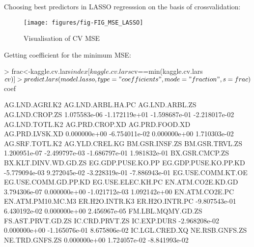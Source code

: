 \documentclass[a4paper]{article}
\begin{document}
Choosing best predictors in LASSO regresssion on the basis of
crossvalidation:

\begin{figure}[H]
\begin{center}
\texttt{[image: figures/fig-FIG\_MSE\_LASSO]}
\caption{Visualisation of CV MSE}
\end{center}
\end{figure}
Getting coefficient for the minimum MSE:
\begin{Schunk}
\begin{Sinput}
> frac<-kaggle.cv.lars$index[kaggle.cv.lars$cv==min(kaggle.cv.lars$cv)]	
> predict.lars(model.lasso, type="coefficients", mode="fraction", s=frac)$coef
\end{Sinput}
\begin{Soutput}
      AG.LND.AGRI.K2    AG.LND.ARBL.HA.PC       AG.LND.ARBL.ZS       AG.LND.CROP.ZS 
        1.075583e-06        -1.172119e+01        -1.598687e-01        -2.218017e-02 
      AG.LND.TOTL.K2       AG.PRD.CROP.XD       AG.PRD.FOOD.XD       AG.PRD.LVSK.XD 
        0.000000e+00        -6.754011e-02         0.000000e+00         1.710303e-02 
      AG.SRF.TOTL.K2       AG.YLD.CREL.KG       BM.GSR.INSF.ZS       BM.GSR.TRVL.ZS 
        1.200951e-07        -2.499797e-03        -1.686797e-01         1.981832e-01 
      BX.GSR.CMCP.ZS BX.KLT.DINV.WD.GD.ZS    EG.GDP.PUSE.KO.PP EG.GDP.PUSE.KO.PP.KD 
       -5.779094e-03         9.272045e-02        -3.228319e-01        -7.886943e-01 
   EG.USE.COMM.KT.OE EG.USE.COMM.GD.PP.KD    EG.USE.ELEC.KH.PC    EN.ATM.CO2E.KD.GD 
        3.794306e-07         0.000000e+00        -1.021712e-03         1.092142e+00 
      EN.ATM.CO2E.PC    EN.ATM.PM10.MC.M3       ER.H2O.INTR.K3       ER.H2O.INTR.PC 
       -9.807543e-01         6.430192e-02         0.000000e+00         2.456967e-05 
   FM.LBL.MQMY.GD.ZS    FS.AST.PRVT.GD.ZS       IC.CRD.PRVT.ZS          IC.EXP.DURS 
       -2.968208e-02         0.000000e+00        -1.165076e-01         8.675806e-02 
      IC.LGL.CRED.XQ       NE.RSB.GNFS.ZS       NE.TRD.GNFS.ZS 
        0.000000e+00         1.724057e-02        -8.841993e-02 
\end{Soutput}
\end{Schunk}
\end{document}
